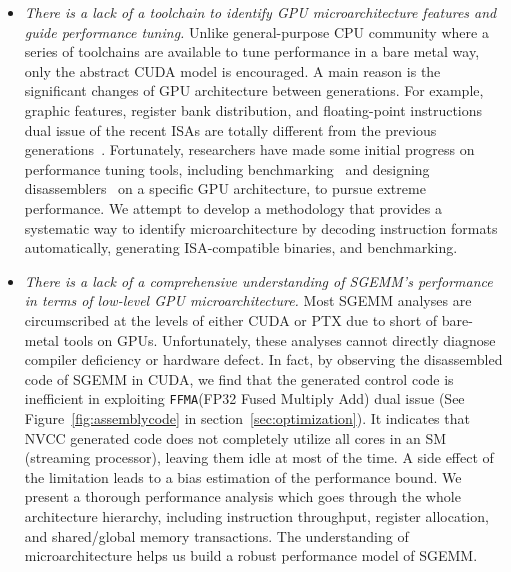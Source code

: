 \begin{itemize}
\item {\em There is a lack of a toolchain to identify GPU microarchitecture features and guide performance tuning.}
    Unlike general-purpose CPU community where a series of toolchains are available to tune performance in a bare metal
        way, only the abstract CUDA model is encouraged. A main reason is the significant changes of GPU architecture
        between generations. For example, graphic features, register bank distribution, and floating-point 
instructions dual
        issue of the recent ISAs are totally different from the previous generations~\cite{fermi}. Fortunately, researchers have made
        some initial progress on performance tuning tools, including benchmarking~\cite{mei, volkov, wong} and designing disassemblers~\cite{asfermi,bernstein2012usable,decuda,maxas} on a 
specific GPU architecture, to pursue extreme performance. We attempt to develop a methodology that provides a systematic way to identify 
microarchitecture by decoding instruction formats automatically, generating ISA-compatible binaries, and benchmarking.
\item {\em There is a lack of a comprehensive understanding of SGEMM's performance in terms of low-level GPU 
microarchitecture.} Most SGEMM analyses are circumscribed at the levels of either CUDA or PTX due to short of 
bare-metal tools on GPUs. Unfortunately, these analyses cannot directly diagnose compiler deficiency or hardware 
defect. In fact, by observing the disassembled code of SGEMM in CUDA, we find that the generated control code is  
inefficient in exploiting {\tt FFMA}(FP32 Fused Multiply Add) dual issue (See Figure~\ref{fig:assemblycode} in section~\ref{sec:optimization}). 
It indicates that NVCC generated code does not 
completely utilize all cores in an SM (streaming processor), leaving 
them idle at most of the time. 
A side effect of the limitation leads to a bias estimation of the performance bound. We 
present a thorough performance analysis which goes through the whole architecture hierarchy, including instruction 
throughput, register allocation, and shared/global memory transactions. The understanding of microarchitecture helps us 
build a robust performance model of SGEMM.
\end{itemize}

